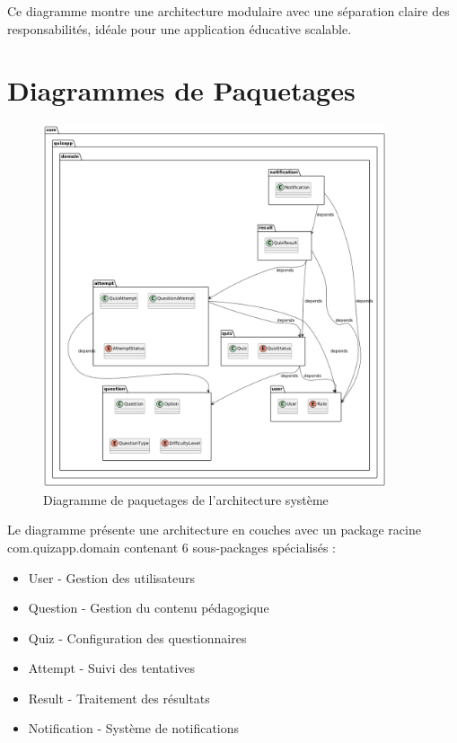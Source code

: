 \documentclass[12pt,a4paper]{report}
\begin{document}
Ce diagramme montre une architecture modulaire avec une séparation claire des responsabilités, idéale pour une application éducative scalable.

\section{Diagrammes de Paquetages}

\begin{figure}[H]
\centering
\includegraphics[width=0.9\textwidth]{latex_media/media/image17.png}
\caption{Diagramme de paquetages de l'architecture système}
\label{fig:diagramme-paquetages}
\end{figure}

Le diagramme présente une architecture en couches avec un package racine com.quizapp.domain contenant 6 sous-packages spécialisés :

\begin{itemize}
\item User - Gestion des utilisateurs
\item Question - Gestion du contenu pédagogique
\item Quiz - Configuration des questionnaires
\item Attempt - Suivi des tentatives
\item Result - Traitement des résultats
\item Notification - Système de notifications
\end{itemize}
\end{document}
